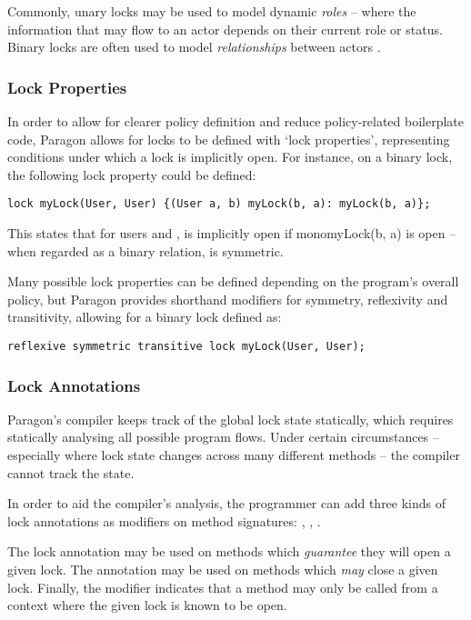 Commonly, unary locks may be used to model dynamic \textit{roles} -- where the information that may flow to an actor depends on their current role or status. Binary locks are often used to model \textit{relationships} between actors \cite{broberg2013paragon}.

\subsubsection{Lock Properties}

In order to allow for clearer policy definition and reduce policy-related boilerplate code, Paragon allows for locks to be defined with `lock properties', representing conditions under which a lock is implicitly open. For instance, on a binary lock, the following lock property could be defined:

\begin{verbatim}
lock myLock(User, User) {(User a, b) myLock(b, a): myLock(b, a)};
\end{verbatim}

This states that for users  and ,  is implicitly open if mono{myLock(b, a)} is open -- when regarded as a binary relation,  is symmetric.

Many possible lock properties can be defined depending on the program's overall policy, but Paragon provides shorthand modifiers for symmetry, reflexivity and transitivity, allowing for a binary lock defined as:

\begin{verbatim}
reflexive symmetric transitive lock myLock(User, User);
\end{verbatim}

\subsubsection{Lock Annotations}

Paragon's compiler keeps track of the global lock state statically, which requires statically analysing all possible program flows. Under certain circumstances -- especially where lock state changes across many different methods -- the compiler cannot track the state.

In order to aid the compiler's analysis, the programmer can add three kinds of lock annotations as modifiers on method signatures: , , .


The \mono{+} lock annotation may be used on methods which \textit{guarantee} they will open a given lock. The \mono{-} annotation may be used on methods which \textit{may} close a given lock. Finally, the \mono{\textasciitilde} modifier indicates that a method may only be called from a context where the given lock is known to be open.

